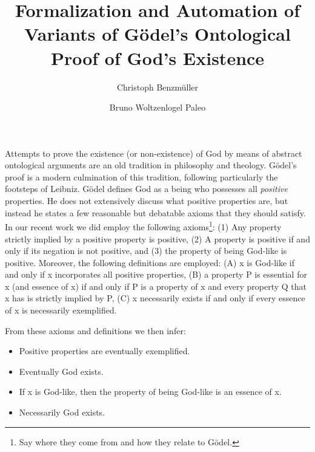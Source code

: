 \documentclass{llncs}
\title{
  Formalization and Automation of Variants of G\"{o}del's Ontological Proof of 
  God's Existence
}
\author{
  Christoph Benzm\"{u}ller\inst{1} 
  \and 
  Bruno Woltzenlogel Paleo\inst{2}
}
\institute{
  Dahlem Center for Intelligent Systems, Freie Universit\"{a}t Berlin, Germany\\
  \email{c.benzmueller@gmail.com}
  \and 
  Theory and Logic Group, Vienna University of Technology, Austria \\
  \email{bruno@logic.at}
}
\begin{document}
\maketitle

Attempts to prove the existence (or non-existence) of God by means of
abstract ontological arguments are an old tradition in philosophy and
theology.  G\"{o}del's proof \cite{Goedel} is a modern culmination of
this tradition, following particularly the footsteps of Leibniz.
%
G\"{o}del defines God as a being who possesses all \emph{positive} properties.
He does not extensively discuss what positive properties are, 
but instead he states a few reasonable but debatable axioms that they should satisfy.
%
In our recent work we did employ the following axioms\footnote{Say where they come from and how they relate to G\"odel.}: (1) Any property strictly implied by a positive property is positive,
(2) A property is positive if and only if its negation is not positive, and (3) the property of being God-like is positive. Moreover, the following definitions are employed:
(A) x is God-like if and only if x incorporates all positive properties, (B) a property P is essential for x (and essence of x) if and only if P is a property of x and every property Q that x has is strictly implied by P, (C) x necessarily exists if and only if every essence of x is necessarily exemplified.

From these axioms and definitions we then infer:
\begin{itemize}
\item Positive properties are eventually exemplified.
\item Eventually God exists.
\item If x is God-like, then the property of being 
God-like is an essence of x.
\item Necessarily God exists.
\end{itemize}

\end{document}
